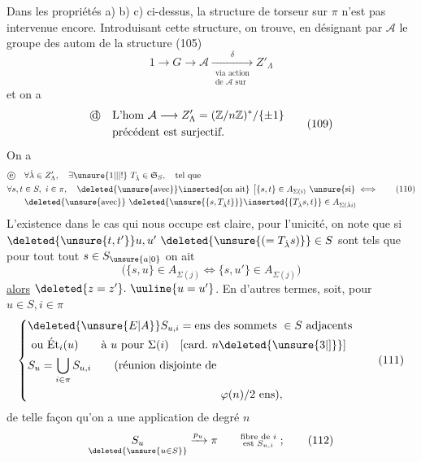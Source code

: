Dans les propriétés a) b) c) ci-dessus, la structure de torseur sur $\pi$ n'est pas intervenue encore. Introduisant cette structure, on trouve, en désignant par $\mathcal A$ le groupe des autom de la structure (105)
\[
1\longrightarrow G\longrightarrow\mathcal A
\xrightarrow[\substack{\text{via action}\\\text{de }\mathcal A\text{ sur}}]{\delta}Z'_\Lambda
\]
et on a
\[
\begin{aligned}
&\text{\textcircled{d}}\quad\text{L'hom }\mathcal A\longrightarrow Z'_\Lambda=(\mathbb Z/n\mathbb Z)^*/\{\pm1\}\\
&\qquad\text{précédent est surjectif.}
\end{aligned}\tag*{(109)}
\]
On a
\[
\begin{aligned}
&\text{\textcircled{e}}\quad\forall\dot\lambda\in Z'_\Lambda,\quad\exists\unsure{1|\vert|!}\ T_{\dot\lambda}\in\mathfrak S_S,\quad\text{tel que}\\
&\forall s,t\in S,\ i\in\pi,\quad\deleted{\text{\unsure{avec}}}\inserted{\text{on ait}}\ 
\bigl[\{s,t\}\in A_{\Sigma(i)}\ \text{\unsure{si}}\iff\\
&\qquad\deleted{\text{\unsure{avec}}}\ \deleted{\unsure{\{s,T_{\dot\lambda}t\}}}\inserted{\{T_{\dot\lambda}s,t\}}\in A_{\Sigma(\dot\lambda i)}
\end{aligned}\tag*{(110)}
\]
L'existence dans le cas qui nous occupe est claire,
pour l'unicité, on note que si $\deleted{\unsure{t,t'}}u,u'\ \deleted{\unsure{(=T_{\dot\lambda}s)}}\in S$ sont tels que pour tout tout $s\in S_{\unsure{a|0}}$  on ait
\[
\bigl(\{s,u\}\in A_{\Sigma(j)}\iff\{s,u'\}\in A_{\Sigma(j)}\bigr)
\]
\uline{alors} $\deleted{z=z'}.~\uuline{u=u'}$. En d'autres termes, soit, pour $u\in S,i\in\pi$
\[
\left\{\begin{aligned}
&\deleted{\unsure{E|A}}S_{u,i}=\text{ens des sommets }\in S\ \text{adjacents}\\
&\ \text{ou }\mathrm{\acute Et}_i(u)\qquad\text{à }u\ \text{pour }\Sigma(i)\quad[\mathrm{card}.\ n\deleted{\unsure{3|]}}]\\
&S_u=\bigcup_{i\in\pi}S_{u,i}\qquad\text{(réunion disjointe de}\\
&\hspace{17em}\varphi(n)/2\ \text{ens}), 
\end{aligned}\right.\tag*{(111)}
\]
 de telle façon qu'on a une application de degré $n$
\[
\underset{\deleted{\unsure{u\in S}}}{S_u}\xrightarrow{p_u}\pi\qquad\substack{\text{fibre de }i\\\text{est }S_{u,i}}\ ;\tag*{(112)}
\]
